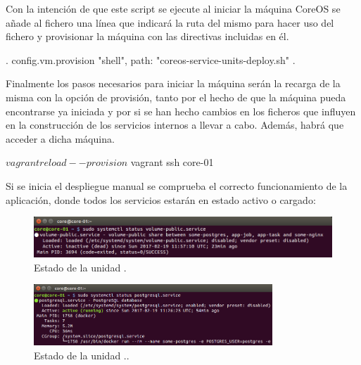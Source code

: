 Con la intención de que este script se ejecute al iniciar la máquina CoreOS se añade al fichero  una línea que indicará la ruta del mismo para hacer uso del fichero y provisionar la máquina con las directivas incluidas en él.

\begin{codelisting}
\label{code:vagrantfile3}
\begin{code}
.
config.vm.provision "shell", path: "coreos-service-units-deploy.sh"
.
\end{code}
\end{codelisting}

Finalmente los pasos necesarios para iniciar la máquina serán la recarga de la misma con la opción de provisión, tanto por el hecho de que la máquina pueda encontrarse ya iniciada y por si se han hecho cambios en los ficheros que influyen en la construcción de los servicios internos a llevar a cabo. Además, habrá que acceder a dicha máquina. 

\begin{code}
$ vagrant reload --provision
$ vagrant ssh core-01
\end{code}

Si se inicia el despliegue manual se comprueba el correcto funcionamiento de la aplicación, donde todos los servicios estarán en estado activo o cargado:

\begin{figure}[H]
\centering
\includegraphics[width=1\textwidth]{images/figures/volume-public.service.png}
\caption{Estado de la unidad .}
\end{figure}

\begin{figure}[H]
\centering
\includegraphics[width=0.8\textwidth]{images/figures/postgresql.service.png}
\caption{Estado de la unidad ..}
\end{figure}

